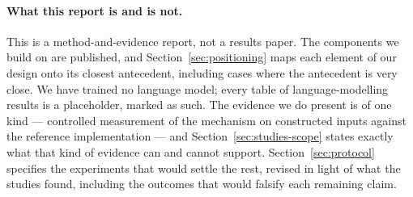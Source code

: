 \paragraph{What this report is and is not.} This is a method-and-evidence report, not a results paper. The components we build on are published, and Section~\ref{sec:positioning} maps each element of our design onto its closest antecedent, including cases where the antecedent is very close. We have trained no language model; every table of language-modelling results is a placeholder, marked as such. The evidence we do present is of one kind --- controlled measurement of the mechanism on constructed inputs against the reference implementation --- and Section~\ref{sec:studies-scope} states exactly what that kind of evidence can and cannot support. Section~\ref{sec:protocol} specifies the experiments that would settle the rest, revised in light of what the studies found, including the outcomes that would falsify each remaining claim.

